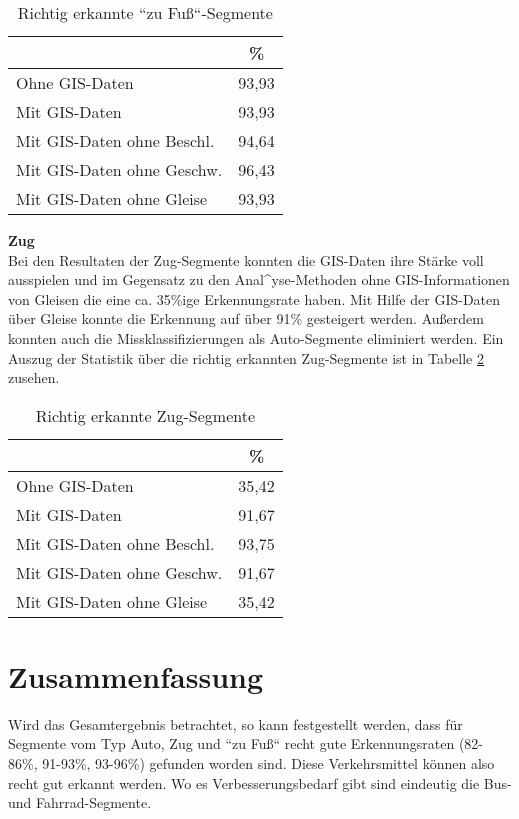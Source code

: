\begin{table}[h]
\centering
\begin{tabular}{|l|c|}
\hline
 & \% \\ \hline
Ohne GIS-Daten & 93,93 \\ \hline
Mit GIS-Daten & 93,93 \\ \hline
Mit GIS-Daten ohne Beschl. & 94,64 \\ \hline
Mit GIS-Daten ohne Geschw. & 96,43 \\ \hline
Mit GIS-Daten ohne Gleise & 93,93 \\ \hline
\end{tabular}
\caption{Richtig erkannte ``zu Fuß``-Segmente}
\label{resultat-foot}
\end{table}

\textbf{Zug} \\
Bei den Resultaten der Zug-Segmente konnten die GIS-Daten ihre Stärke voll ausspielen und im Gegensatz zu den Anal^yse-Methoden ohne GIS-Informationen von Gleisen die eine ca. 35\%ige Erkennungsrate haben. Mit Hilfe der GIS-Daten über Gleise konnte die Erkennung auf über 91\% gesteigert werden. Außerdem konnten auch die Missklassifizierungen als Auto-Segmente eliminiert werden. Ein Auszug der Statistik über die richtig erkannten Zug-Segmente ist in Tabelle \ref{result-train} zusehen.

\begin{table}[h]
\centering
\begin{tabular}{|l|c|}
\hline
 & \% \\ \hline
Ohne GIS-Daten & 35,42 \\ \hline
Mit GIS-Daten & 91,67 \\ \hline
Mit GIS-Daten ohne Beschl. & 93,75 \\ \hline
Mit GIS-Daten ohne Geschw. & 91,67 \\ \hline
Mit GIS-Daten ohne Gleise & 35,42 \\ \hline
\end{tabular}
\caption{Richtig erkannte Zug-Segmente}
\label{result-train}
\end{table}

\section{Zusammenfassung}
Wird das Gesamtergebnis betrachtet, so kann festgestellt werden, dass für Segmente vom Typ Auto, Zug und ``zu Fuß`` recht gute Erkennungsraten (82-86\%, 91-93\%, 93-96\%) gefunden worden sind. Diese Verkehrsmittel können also recht gut erkannt werden. Wo es Verbesserungsbedarf gibt sind eindeutig die Bus- und Fahrrad-Segmente.  

